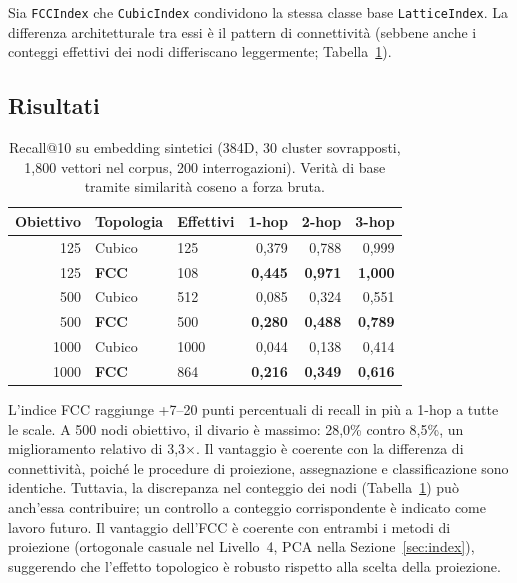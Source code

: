 \documentclass[11pt]{article}
\begin{document}
Sia \texttt{FCCIndex} che \texttt{CubicIndex} condividono la stessa
classe base \texttt{LatticeIndex}. La differenza architetturale tra essi
\`e il pattern di connettivit\`a (sebbene anche i conteggi effettivi dei
nodi differiscano leggermente; Tabella~\ref{tab:index}).

\subsection{Risultati}

\begin{table}[H]
\centering
\caption{Recall@10 su embedding sintetici (384D, 30 cluster
sovrapposti, 1{,}800 vettori nel corpus, 200 interrogazioni). Verit\`a
di base tramite similarit\`a coseno a forza bruta.}
\label{tab:index}
\begin{tabular}{rllrrr}
\toprule
Obiettivo & Topologia & Effettivi & 1-hop & 2-hop & 3-hop \\
\midrule
125  & Cubico       & 125 & 0,379 & 0,788 & 0,999 \\
125  & \textbf{FCC}& 108 & \textbf{0,445} & \textbf{0,971} & \textbf{1,000} \\
\midrule
500  & Cubico       & 512 & 0,085 & 0,324 & 0,551 \\
500  & \textbf{FCC}& 500 & \textbf{0,280} & \textbf{0,488} & \textbf{0,789} \\
\midrule
1000 & Cubico       & 1000 & 0,044 & 0,138 & 0,414 \\
1000 & \textbf{FCC}& 864 & \textbf{0,216} & \textbf{0,349} & \textbf{0,616} \\
\bottomrule
\end{tabular}
\end{table}

L'indice FCC raggiunge +7--20 punti percentuali di recall in pi\`u
a 1-hop a tutte le scale. A 500 nodi obiettivo, il divario \`e massimo:
28,0\% contro 8,5\%, un miglioramento relativo di 3,3$\times$.
Il vantaggio \`e coerente con la differenza di connettivit\`a, poich\'e
le procedure di proiezione, assegnazione e classificazione sono identiche.
Tuttavia, la discrepanza nel conteggio dei nodi
(Tabella~\ref{tab:index}) pu\`o anch'essa contribuire; un controllo a
conteggio corrispondente \`e indicato come lavoro futuro. Il vantaggio
dell'FCC \`e coerente con entrambi i metodi di proiezione (ortogonale
casuale nel Livello~4, PCA nella Sezione~\ref{sec:index}), suggerendo
che l'effetto topologico \`e robusto rispetto alla scelta della
proiezione.

\end{document}
